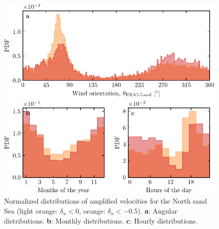 \begin{figure}[p]
\centering
\includegraphics[scale=1]{Figures/Figure12_supp.pdf}
\caption{Normalized distributions of amplified velocities for the North sand Sea (light orange: $\delta_u < 0$, orange: $\delta_u < -0.5$). \textbf{a}: Angular distributions. \textbf{b}: Monthly distributions. \textbf{c}: Hourly distributions.}
\label{Fig12_supp}
\end{figure}

